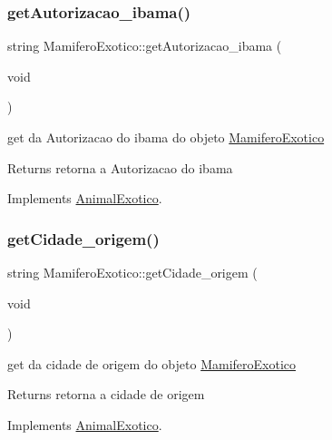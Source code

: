 \subsubsection{\texorpdfstring{getAutorizacao\_ibama()}{getAutorizacao\_ibama()}}
{\footnotesize\ttfamily string Mamifero\+Exotico\+::get\+Autorizacao\+\_\+ibama (\begin{DoxyParamCaption}\item[{void}]{ }\end{DoxyParamCaption})\hspace{0.3cm}{\ttfamily [virtual]}}



get da Autorizacao do ibama do objeto \mbox{\hyperlink{class_mamifero_exotico}{Mamifero\+Exotico}} 

\begin{DoxyReturn}{Returns}
retorna a Autorizacao do ibama 
\end{DoxyReturn}


Implements \mbox{\hyperlink{class_animal_exotico}{Animal\+Exotico}}.

\mbox{\label{class_mamifero_exotico_ab210e7210e383f5ab553b6ff8ccd5475}} 
\subsubsection{\texorpdfstring{getCidade\_origem()}{getCidade\_origem()}}
{\footnotesize\ttfamily string Mamifero\+Exotico\+::get\+Cidade\+\_\+origem (\begin{DoxyParamCaption}\item[{void}]{ }\end{DoxyParamCaption})\hspace{0.3cm}{\ttfamily [virtual]}}



get da cidade de origem do objeto \mbox{\hyperlink{class_mamifero_exotico}{Mamifero\+Exotico}} 

\begin{DoxyReturn}{Returns}
retorna a cidade de origem 
\end{DoxyReturn}


Implements \mbox{\hyperlink{class_animal_exotico}{Animal\+Exotico}}.

\mbox{\label{class_mamifero_exotico_a007b102f26f2d16b68d8981d69470a9c}} 
